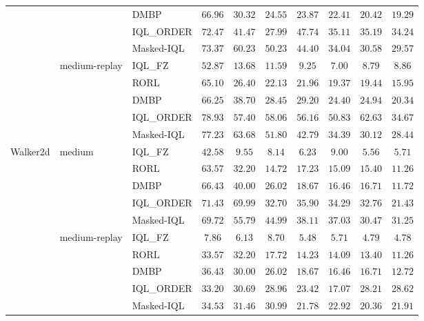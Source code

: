 \begin{table}[!htbp]
{\begin{tabular}{lll|ccccccc}
        & & DMBP          & $66.96$ & $30.32$ & $24.55$ & $23.87$ & $22.41$ & $20.42$ & $19.29$ \\
        & & IQL\_ORDER    & $72.47$ & $41.47$ & $27.99$ & $\mathbf{47.74}$ & $\mathbf{35.11}$ & $\mathbf{35.19}$ & $\mathbf{34.24}$ \\
        & & Masked-IQL    & $\mathbf{73.37}$ & $\mathbf{60.23}$ & $\mathbf{50.23}$ & $44.40$ & $34.04$ & $30.58$ & $29.57$ \\
        \cline{2-10}
        & \multirow{5}{*}{medium-replay}
        & IQL\_FZ       & $52.87$ & $13.68$ & $11.59$ & $9.25$ & $7.00$ & $8.79$ & $8.86$ \\
        & & RORL          & $65.10$ & $26.40$ & $22.13$ & $21.96$ & $19.37$ & $19.44$ & $15.95$ \\
        & & DMBP          & $66.25$ & $38.70$ & $28.45$ & $29.20$ & $24.40$ & $24.94$ & $20.34$ \\
        & & IQL\_ORDER    & $\mathbf{78.93}$ & $57.40$ & $\mathbf{58.06}$ & $\mathbf{56.16}$ & $\mathbf{50.83}$ & $\mathbf{62.63}$ & $\mathbf{34.67}$ \\
        & & Masked-IQL    & $77.23$ & $\mathbf{63.68}$ & $51.80$ & $42.79$ & $34.39$ & $30.12$ & $28.44$ \\
        \hline
        \multirow{10}{*}{Walker2d}
        & \multirow{5}{*}{medium}
        & IQL\_FZ       & $42.58$ & $9.55$ & $8.14$ & $6.23$ & $9.00$ & $5.56$ & $5.71$ \\
        & & RORL          & $63.57$ & $32.20$ & $14.72$ & $17.23$ & $15.09$ & $15.40$ & $11.26$ \\
        & & DMBP          & $66.43$ & $40.00$ & $26.02$ & $18.67$ & $16.46$ & $16.71$ & $11.72$ \\
        & & IQL\_ORDER    & $\mathbf{71.43}$ & $\mathbf{69.99}$ & $32.70$ & $35.90$ & $34.29$ & $\mathbf{32.76}$ & $21.43$ \\
        & & Masked-IQL    & $69.72$ & $55.79$ & $\mathbf{44.99}$ & $\mathbf{38.11}$ & $\mathbf{37.03}$ & $30.47$ & $\mathbf{31.25}$ \\
        \cline{2-10}
        & \multirow{5}{*}{medium-replay}
        & IQL\_FZ       & $7.86$ & $6.13$ & $8.70$ & $5.48$ & $5.71$ & $4.79$ & $4.78$ \\
        & & RORL          & $33.57$ & $\mathbf{32.20}$ & $17.72$ & $14.23$ & $14.09$ & $13.40$ & $11.26$ \\
        & & DMBP          & $\mathbf{36.43}$ & $30.00$ & $26.02$ & $18.67$ & $16.46$ & $16.71$ & $12.72$ \\
        & & IQL\_ORDER    & $33.20$ & $30.69$ & $28.96$ & $\mathbf{23.42}$ & $17.07$ & $\mathbf{28.21}$ & $\mathbf{28.62}$ \\
        & & Masked-IQL    & $34.53$ & $31.46$ & $\mathbf{30.99}$ & $21.78$ & $\mathbf{22.92}$ & $20.36$ & $21.91$ \\
        \hline
    \end{tabular}
    }
\end{table}

